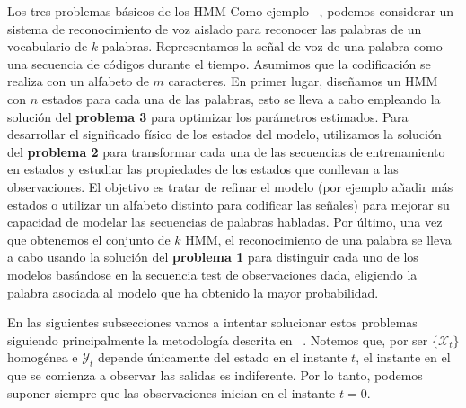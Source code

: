 \begin{section}{Los tres problemas básicos de los HMM}
Como ejemplo ~\cite{Rabiner}, podemos considerar un sistema de reconocimiento de voz aislado para reconocer las palabras de un vocabulario de $k$ palabras. Representamos la señal de voz de una palabra como una secuencia de códigos durante el tiempo. Asumimos que la codificación se realiza con un alfabeto de $m$ caracteres. En primer lugar, diseñamos un HMM con $n$ estados para cada una de las palabras, esto se lleva a cabo empleando la solución del \textbf{problema 3} para optimizar los parámetros estimados. Para desarrollar el significado físico de los estados del modelo, utilizamos la solución del \textbf{problema 2} para transformar cada una de las secuencias de entrenamiento en estados y estudiar las propiedades de los estados que conllevan a las observaciones. El objetivo es tratar de refinar el modelo (por ejemplo añadir más estados o utilizar un alfabeto distinto para codificar las señales) para mejorar su capacidad de modelar las secuencias de palabras habladas. Por último, una vez que obtenemos el conjunto de $k$ HMM, el reconocimiento de una palabra se lleva a cabo usando la solución del \textbf{problema 1} para distinguir cada uno de los modelos basándose en la secuencia test de observaciones dada, eligiendo la palabra asociada al modelo que ha obtenido la mayor probabilidad.

En las siguientes subsecciones vamos a intentar solucionar estos problemas siguiendo principalmente la metodología descrita en ~\cite{Rabiner}. Notemos que, por ser $\{\mathcal{X}_t\}$ homogénea e $\mathcal{Y}_t$ depende únicamente del estado en el instante $t$, el instante en el que se comienza a observar las salidas es indiferente. Por lo tanto, podemos suponer siempre que las observaciones inician en el instante $t=0$.


\end{section}
